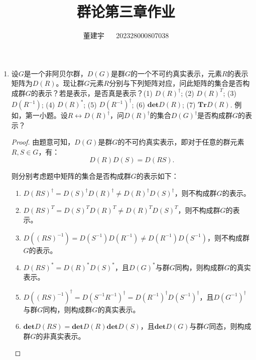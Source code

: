 \documentclass[reqno,a4paper,12pt]{amsart}
\title{群论第三章作业}
\author{董建宇 ~~ 202328000807038}
\begin{document}
\maketitle
\titleformat{\section}[hang]{\small}{\thesection}{0.8em}{}{}
\titleformat{\subsection}[hang]{\small}{\thesubsection}{0.8em}{}{}

\begin{enumerate}[1.]

\item 设$G$是一个非阿贝尔群，$D(G)$是群$G$的一个不可约真实表示，元素$R$的表示矩阵为$D(R)$。现让群$G$元素$R$分别与下列矩阵对应，问此矩阵的集合是否构成群$G$的表示？若是表示，是否真是表示？(1) $D(R)^\dagger$; (2) $D(R)^T$; (3) $D(R^{-1})$; (4) $D(R)^*$; (5) $D(R^{-1})^\dagger$; (6) $\mathbf{det}D(R)$; (7) $\mathbf{Tr}D(R)$. 例如，第一小题。设$R\longleftrightarrow D(R)^\dagger$，问$D(R)^\dagger$的集合$D(G)^\dagger$是否构成群$G$的表示？

\begin{proof}
由题意可知，$D(G)$是群$G$的不可约真实表示，即对于任意的群元素$R,S\in G$，有：
\[
	D(R) D(S) = D(RS).
\]

则分别考虑题中矩阵的集合是否构成群$G$的表示如下：
\begin{enumerate}[(1)]
\item $D(RS)^\dagger = D(S)^\dagger D(R)^\dagger \neq D(R)^\dagger D(S)^\dagger$，则不构成群$G$的表示。

\item $D(RS)^T = D(S)^T D(R)^T \neq D(R)^T D(S)^T$，则不构成群$G$的表示。

\item $D((RS)^{-1}) = D(S^{-1}) D(R^{-1}) \neq D(R^{-1}) D(S^{-1})$，则不构成群$G$的表示。

\item $D(RS)^* = D(R)^* D(S)^*$，且$D(G)^*$与群$G$同构，则构成群$G$的真实表示。

\item $D((RS)^{-1})^\dagger = D(S^{-1}R^{-1})^\dagger = D(R^{-1})^\dagger D(S^{-1})^\dagger$，且$D(G^{-1})^\dagger$与群$G$同构，则构成群$G$的真实表示。

\item $\mathbf{det}D(RS) = \mathbf{det} D(R) \mathbf{det} D(S)$，且$\mathbf{det} D(G)$与群$G$同态，则构成群$G$的非真实表示。


\end{enumerate}
\end{proof}
\end{enumerate}
\end{document}
